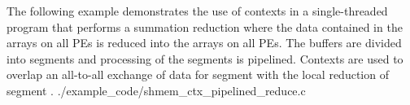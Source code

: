 \begin{apidefinition}
\begin{apiexamples}
    \apicexample
    {The following example demonstrates the use of contexts in a
    single-threaded \Cstd[11] program that performs a summation reduction where
    the data contained in the  arrays on all \acp{PE} is reduced into
    the  arrays on all \acp{PE}.  The buffers are divided into
    segments and processing of the segments is pipelined.  Contexts are used
    to overlap an all-to-all exchange of data for segment  with the
    local reduction of segment .}
    {./example_code/shmem_ctx_pipelined_reduce.c}
    {}


\end{apiexamples}

\end{apidefinition}

